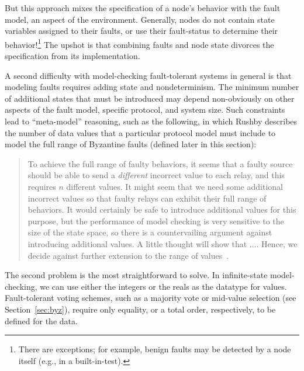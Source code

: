 \documentclass{llncs/llncs}
\newcommand{\lee}[1]{ } %
\newcommand{\lee}[1]{ {\color{blue}$<$lee: #1$>$} } %
\begin{document}

\noindent
But this approach mixes the specification of a node's behavior with the fault model, an aspect of the environment. Generally, nodes do not contain state variables assigned to their faults, or use their fault-status to determine their behavior!\footnote{There are exceptions; for example, benign faults may be detected by a node itself (e.g., in a built-in-test).} The upshot is that combining faults and node state divorces the specification from its implementation.

A second difficulty with model-checking fault-tolerant systems in general is that modeling faults requires adding state and nondeterminism. The minimum number of additional states that must be introduced may depend non-obviously on other aspects of the fault model, specific protocol, and system size. Such constraints lead to ``meta-model'' reasoning, such as the following, in which Rushby describes the number of data values that a particular protocol model must include to model the full range of Byzantine faults (defined later in this section):

\begin{quote}
To achieve the full range of faulty behaviors, it seems that a faulty source should be able to send a \emph{different} incorrect value to each relay, and this requires $n$ different values. It might seem that we need some additional incorrect values so that faulty relays can exhibit their full range of behaviors. It would certainly be safe to introduce additional values for this purpose, but the performance of model checking is very sensitive to the size of the state space, so there is a countervailing argument against introducing additional values. A little thought will show that $\ldots$. Hence, we decide against further extension to the range of values~\cite{Rushby:OM1}.
\end{quote}

The second problem is the most straightforward to solve. In infinite-state model-checking, we can use either the integers or the reals as the datatype for values. Fault-tolerant voting schemes, such as a majority vote or mid-value selection (see Section~\ref{sec:byz}), require only equality, or a total order, respectively, to be defined for the data.
\end{document}
